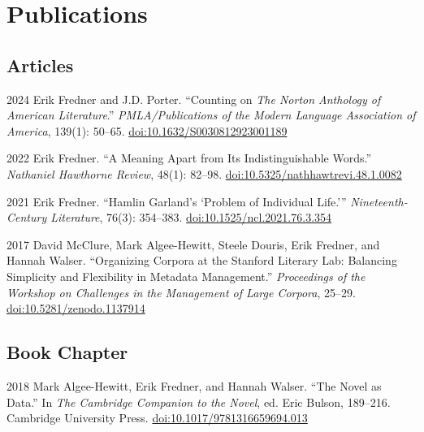 \documentclass[12pt,letterpaper]{report}
\begin{document}
\section*{Publications}

\subsection*{Articles}

\begin{tablist}
	\item[2024] \tab{}Erik Fredner and J.D. Porter. \enquote{Counting on \textit{The Norton Anthology of American Literature}.} \textit{PMLA/Publications of the Modern Language Association of America}, 139(1): 50--65. \href{https://doi.org/10.1632/S0030812923001189}{doi:10.1632/S0030812923001189}
	\item[2022] \tab{}Erik Fredner. \enquote{A Meaning Apart from Its Indistinguishable Words.} \textit{Nathaniel Hawthorne Review}, 48(1): 82--98. \href{https://doi.org/10.5325/nathhawtrevi.48.1.0082}{doi:10.5325/nathhawtrevi.48.1.0082}
	\item[2021] \tab{}Erik Fredner. \enquote{Hamlin Garland's \enquote{Problem of Individual Life.}} \textit{Nineteenth-Century Literature}, 76(3): 354--383. \href{https://doi.org/10.1525/ncl.2021.76.3.354}{doi:10.1525/ncl.2021.76.3.354}
	\item[2017] \tab{}David McClure, Mark Algee-Hewitt, Steele Douris, Erik Fredner, and Hannah Walser. \enquote{Organizing Corpora at the Stanford Literary Lab: Balancing Simplicity and Flexibility in Metadata Management.} \textit{Proceedings of the Workshop on Challenges in the Management of Large Corpora}, 25--29. \href{https://ids-pub.bsz-bw.de/frontdoor/index/index/docId/6261}{doi:10.5281/zenodo.1137914}
\end{tablist}

\subsection*{Book Chapter}

\begin{tablist}
	\item[2018] \tab{}Mark Algee-Hewitt, Erik Fredner, and Hannah Walser. \enquote{The Novel as Data.} In \textit{The Cambridge Companion to the Novel}, ed. Eric Bulson, 189--216. Cambridge University Press. \href{https://doi.org/10.1017/9781316659694.013}{doi:10.1017/9781316659694.013}
\end{tablist}
\end{document}
